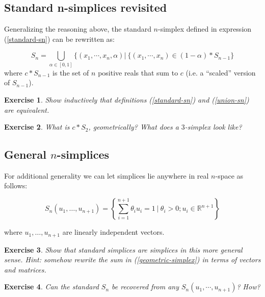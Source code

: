 \documentclass{tufte-handout}
\newtheorem{exercise}{Exercise}
\newcommand{\re}{\mathbb{R}}
\begin{document}
\subsection{Standard n-simplices revisited}
Generalizing the reasoning above, the standard $n$-simplex defined in expression (\ref{standard-sn}) can be rewritten as:


\begin{equation}
    S_n = \bigcup_{\alpha\in[0,1]} \{(x_1,\cdots,x_n,\alpha) | \ \{(x_1,\cdots,x_n)\in (1-\alpha)*S_{n-1}  \}
\label{union-sn}
\end{equation}
where $c*S_{n-1}$ is the set of $n$ positive reals that sum to $c$ (i.e. a ``scaled'' version of $S_{n-1}$).
\begin{exercise}
Show inductively that definitions (\ref{standard-sn}) and (\ref{union-sn}) are equivalent.
\end{exercise}
\begin{exercise}
What is $c*S_2$, geometrically? What does a $3$-simplex look like?
\end{exercise}
\subsection{General $n$-simplices}
For additional generality we can let simplices lie anywhere in real $n$-space as follows:

\begin{equation}
    S_{n}(u_1,\ldots,u_{n+1}) = \left\{\sum_{i=1}^{n+1} \theta_i u_i = 1\ |\  \theta_i>0; u_i\in \re^{n+1} \right\}
    \label{geometric-simplex}
\end{equation}

where $u_1,\ldots,u_{n+1}$ are linearly independent vectors. 

\begin{exercise}
Show that standard simplices are simplices in this more general sense. Hint: somehow rewrite the sum in (\ref{geometric-simplex}) in terms of vectors and matrices.
\end{exercise}
\begin{exercise}
Can the standard $S_n$ be recovered from any $S_n(u_1,\cdots,u_{n+1})$? How?
\end{exercise}
\end{document}
